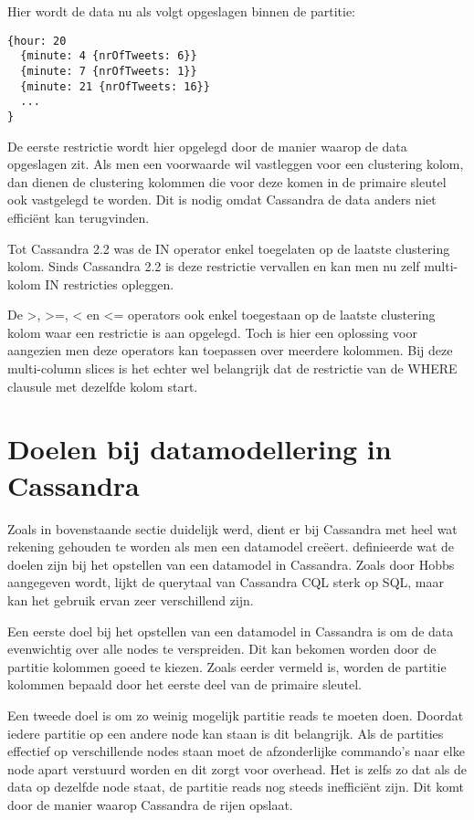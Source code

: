Hier wordt de data nu als volgt opgeslagen binnen de partitie: 

\begin{lstlisting}
{hour: 20 
  {minute: 4 {nrOfTweets: 6}} 
  {minute: 7 {nrOfTweets: 1}}
  {minute: 21 {nrOfTweets: 16}}
  ...
}
\end{lstlisting}

De eerste restrictie wordt hier opgelegd door de manier waarop de data opgeslagen zit.
Als men een voorwaarde wil vastleggen voor een clustering kolom, dan dienen de clustering kolommen die voor deze komen in de primaire sleutel ook vastgelegd te worden.
Dit is nodig omdat Cassandra de data anders niet efficiënt kan terugvinden.

Tot Cassandra 2.2 was de IN operator enkel toegelaten op de laatste clustering kolom.
Sinds Cassandra 2.2 is deze restrictie vervallen en kan men nu zelf multi-kolom IN restricties opleggen.

De >, >=, < en <= operators ook enkel toegestaan op de laatste clustering kolom waar een restrictie is aan opgelegd.
Toch is hier een oplossing voor aangezien men deze operators kan toepassen over meerdere kolommen.
Bij deze multi-column slices is het echter wel belangrijk dat de restrictie van de WHERE clausule met dezelfde kolom start.

\section{Doelen bij datamodellering in Cassandra}
Zoals in bovenstaande sectie duidelijk werd, dient er bij Cassandra met heel wat rekening gehouden te worden als men een datamodel creëert.
\cite{Hobbs2015Datamodelling} definieerde wat de doelen zijn bij het opstellen van een datamodel in Cassandra.
Zoals door Hobbs aangegeven wordt, lijkt de querytaal van Cassandra CQL sterk op SQL, maar kan het gebruik ervan zeer verschillend zijn.

Een eerste doel bij het opstellen van een datamodel in Cassandra is om de data evenwichtig over alle nodes te verspreiden.
Dit kan bekomen worden door de partitie kolommen goeed te kiezen.
Zoals eerder vermeld is, worden de partitie kolommen bepaald door het eerste deel van de primaire sleutel.

Een tweede doel is om zo weinig mogelijk partitie reads te moeten doen.
Doordat iedere partitie op een andere node kan staan is dit belangrijk.
Als de partities effectief op verschillende nodes staan moet de afzonderlijke commando's naar elke node apart verstuurd worden en dit zorgt voor overhead.
Het is zelfs zo dat als de data op dezelfde node staat, de partitie reads nog steeds inefficiënt zijn.
Dit komt door de manier waarop Cassandra de rijen opslaat.

